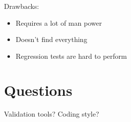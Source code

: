 \documentclass[a4paper, 11pt]{article}
\begin{document}
    Drawbacks:
    \begin{itemize}
        \item Requires a lot of man power
        \item Doesn't find everything
        \item Regression tests are hard to perform
    \end{itemize}

    \section{Questions}

    Validation tools? Coding style?
\end{document}
